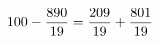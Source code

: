 \documentclass[preview]{standalone}
\begin{document}
\begin{align*}
\special{dvisvgm:raw <g id='unique000'>}100 - \frac{890}{19} = \frac{209}{19} + \frac{801}{19}\special{dvisvgm:raw </g>}
\end{align*}
\end{document}
